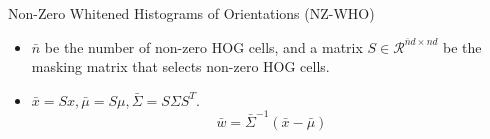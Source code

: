\documentclass[serif,mathserif,final]{beamer}
\newcommand{\1}{\mathbb{I}} %
\begin{document}
\begin{frame}{}
\begin{columns}[t]
\begin{column}{0.24\linewidth}
\begin{block}{Non-Zero Whitened Histograms of Orientations (NZ-WHO)}
\begin{itemize}
          \item $\bar{n}$ be the number of non-zero HOG cells, and a matrix
            $S\in \mathcal{R}^{\bar{n}d \times nd}$ be the masking matrix that
            selects non-zero HOG cells.



          \item $\bar{x} = S x, \bar{\mu} = S\mu, \bar{\Sigma} = S \Sigma S^T$. 
            \begin{equation}
              \bar{w}=\bar{\Sigma}^{-1}(\bar{x} - \bar{\mu}) \label{eq:nz-who}
            \end{equation}
        \end{itemize}


\end{block}
\end{column}
\end{columns}
\end{frame}
\end{document}
